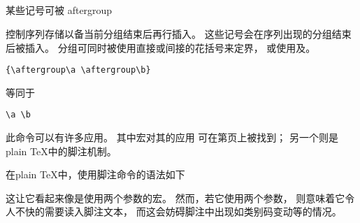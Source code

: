 \documentclass{book}
\begin{document}
\subsection{\protect{}}
\label{sec:aftergroup}

某些记号可被
\cstoidx aftergroup\par
\begin{disp}\end{disp}
控制序列存储以备当前分组结束后再行插入。
这些记号会在序列出现的分组结束后被插入。
分组可同时被使用直接或间接的花括号来定界，
或使用及。

\begin{example}
\begin{verbatim}
{\aftergroup\a \aftergroup\b}
\end{verbatim}
等同于
\begin{verbatim}
\a \b
\end{verbatim}
\end{example}

此命令可以有许多应用。
其中宏对其的应用
可在第\pageref{text:vcenter}页上被找到；
另一个则是plain {\TeX}中的脚注机制。

在plain {\TeX}中，使用脚注命令的语法如下
\label{footnote:ex}
\begin{disp}\lb{}\rb
\end{disp} 这让它看起来像是使用两个参数的宏。
然而，若它使用两个参数，
则意味着它令人不快的需要读入脚注文本，
而这会妨碍脚注中出现如类别码变动等的情况。
\end{document}
